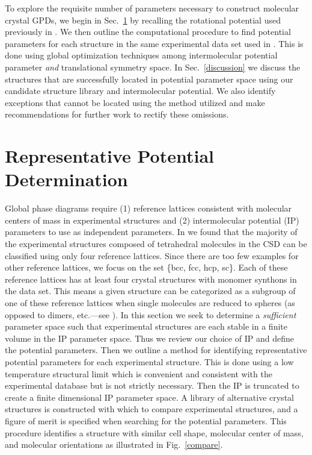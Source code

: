 \documentclass[preprint]{iucr}              %
\begin{document}
To explore the requisite number of parameters necessary to construct molecular crystal GPDs, we begin in Sec.~\ref{method} by recalling the rotational potential used previously in \cite{Mettes04}.  We then outline the computational procedure to find potential parameters for each structure in the same experimental data set used in \cite{McClurg09}. This is done using global optimization techniques among intermolecular potential parameter
\emph{and} translational symmetry space. In Sec.~\ref{discussion} we discuss the structures that are successfully located in potential parameter space using our candidate structure library and intermolecular potential.  We also identify exceptions that cannot be located using the method utilized and make recommendations for further work to rectify these omissions.


\section{Representative Potential Determination}
\label{method}

Global phase diagrams require (1) reference lattices consistent with
molecular centers of mass in experimental structures and (2)
intermolecular potential (IP) parameters to use as independent
parameters. In \cite{McClurg09} we found that the majority of the
experimental structures composed of tetrahedral molecules in the CSD can be
classified using only four reference lattices. Since there are too few examples for other reference lattices, we focus on the set \{bcc, fcc,
hcp, sc\}. Each of these reference lattices has at least four crystal
structures with monomer synthons in the data set.  This means a given structure can be categorized as a subgroup of one of these reference lattices when single molecules are reduced to spheres (as opposed to dimers, etc.—see \cite{McClurg09}).  In this section we seek to determine a \emph{sufficient} parameter space such that experimental
structures are each stable in a finite volume in the IP parameter space. Thus we review
our choice of IP and define the potential parameters.  Then we
outline a method for identifying representative potential parameters
for each experimental structure. This is done using a low
temperature structural limit which is convenient and consistent with the experimental database but is not strictly necessary.  Then
the IP is truncated to create a finite dimensional IP parameter
space.  A library of alternative crystal structures is constructed
with which to compare experimental structures, and a figure of merit
is specified when searching for the potential parameters. This
procedure identifies a structure with similar cell shape, molecular
center of mass, and molecular orientations as illustrated in
Fig.~\ref{compare}.
\end{document}

